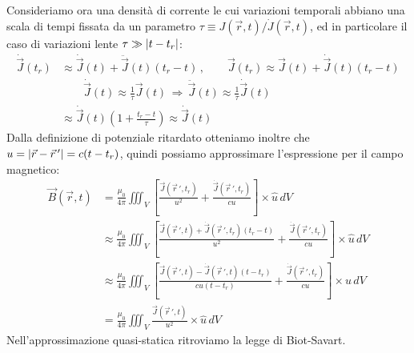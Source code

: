 Consideriamo ora una densità di corrente le cui variazioni temporali abbiano una scala di tempi fissata da un parametro $ \tau \equiv J(\vec{r},t) / \dot{J}(\vec{r},t) $, ed in particolare il caso di variazioni lente $ \tau \gg \left\lvert t - t_r\right\rvert $:
\begin{equation}
	\begin{split}
		\dot{\vec{J}}(t_r) &\approx \dot{\vec{J}}(t) + \ddot{\vec{J}}(t)(t_r - t) \,,\qquad \vec{J}(t_r) \approx \vec{J}(t) + \dot{\vec{J}}(t)(t_r - t) \\ 
				   &\qquad \dot{\vec{J}}(t) \approx \frac{1}{\tau}\vec{J}(t) \,\Rightarrow\, \ddot{\vec{J}}(t) \approx \frac{1}{\tau} \dot{\vec{J}}(t) \\ 
				   &\approx \dot{\vec{J}}(t)\left(1 + \frac{t_r - t}{\tau}\right) \approx \dot{\vec{J}}(t)
	\end{split}
	\label{eq:89}
\end{equation}
Dalla definizione di potenziale ritardato otteniamo inoltre che $ u = \left\lvert\vec{r} - \vec{r}\,'\right\rvert = c (t - t_r) $, quindi possiamo approssimare l'espressione per il campo magnetico:
\begin{equation}
	\begin{split}
		\vec{B}(\vec{r},t) &= \frac{\mu_0}{4\pi} \iiint_V \left[ \frac{\vec{J}(\vec{r}\,', t_r)}{u^2} + \frac{\dot{\vec{J}}(\vec{r}\,', t_r)}{cu} \right] \times \hat{u} \,dV \\ 
				   &\approx \frac{\mu_0}{4\pi} \iiint_V \left[ \frac{\vec{J}(\vec{r}\,', t) + \dot{\vec{J}}(\vec{r}\,',t_r)(t_r - t)}{u^2} + \frac{\dot{\vec{J}}(\vec{r}\,', t_r)}{cu} \right] \times \hat{u} \,dV \\ 
				   &\approx \frac{\mu_0}{4\pi} \iiint_V \left[ \frac{\vec{J}(\vec{r}\,', t) - \dot{\vec{J}}(\vec{r}\,',t)(t - t_r)}{cu (t - t_r)} + \frac{\dot{\vec{J}}(\vec{r}\,', t_r)}{cu} \right] \times \hat{u} \,dV \\ 
				   &= \frac{\mu_0}{4\pi} \iiint_V \frac{\vec{J}(\vec{r}\,', t)}{u^2} \times \hat{u} \,dV
	\end{split}
	\label{eq:90}
\end{equation}
Nell'approssimazione quasi-statica ritroviamo la legge di Biot-Savart.
